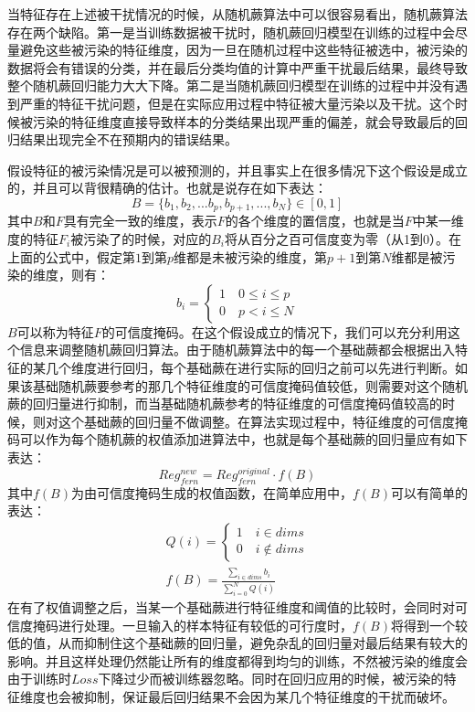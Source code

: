 当特征存在上述被干扰情况的时候，从随机蕨算法中可以很容易看出，随机蕨算法存在两个缺陷。第一是当训练数据被干扰时，随机蕨回归模型在训练的过程中会尽量避免这些被污染的特征维度，因为一旦在随机过程中这些特征被选中，被污染的数据将会有错误的分类，并在最后分类均值的计算中严重干扰最后结果，最终导致整个随机蕨回归能力大大下降。第二是当随机蕨回归模型在训练的过程中并没有遇到严重的特征干扰问题，但是在实际应用过程中特征被大量污染以及干扰。这个时候被污染的特征维度直接导致样本的分类结果出现严重的偏差，就会导致最后的回归结果出现完全不在预期内的错误结果。

假设特征的被污染情况是可以被预测的，并且事实上在很多情况下这个假设是成立的，并且可以背很精确的估计。也就是说存在如下表达：
\begin{equation}
	B=\{b_1,b_2,...b_p,b_{p+1},...,b_N\}\in[0,1]
\end{equation}
其中$B$和$F$具有完全一致的维度，表示$F$的各个维度的置信度，也就是当$F$中某一维度的特征$F_i$被污染了的时候，对应的$B_i$将从百分之百可信度变为零（从1到0）。在上面的公式中，假定第$1$到第$p$维都是未被污染的维度，第$p+1$到第$N$维都是被污染的维度，则有：
\begin{equation}
b_i=
\begin{cases}
1\quad {0\leq i\leq p} \\
0\quad {p<i\leq N}
\end{cases}
\end{equation}
$B$可以称为特征$F$的可信度掩码。在这个假设成立的情况下，我们可以充分利用这个信息来调整随机蕨回归算法。由于随机蕨算法中的每一个基础蕨都会根据出入特征的某几个维度进行回归，每个基础蕨在进行实际的回归之前可以先进行判断。如果该基础随机蕨要参考的那几个特征维度的可信度掩码值较低，则需要对这个随机蕨的回归量进行抑制，而当基础随机蕨参考的特征维度的可信度掩码值较高的时候，则对这个基础蕨的回归量不做调整。在算法实现过程中，特征维度的可信度掩码可以作为每个随机蕨的权值添加进算法中，也就是每个基础蕨的回归量应有如下表达：
\begin{equation}
	Reg_{fern}^{new} = Reg_{fern}^{original}\cdot f(B)
\end{equation}
其中$f(B)$为由可信度掩码生成的权值函数，在简单应用中，$f(B)$可以有简单的表达：
\begin{equation}
\begin{aligned}
	Q(i)=
	\begin{cases}
		1\quad i\in dims \\
		0\quad i\not\in dims
	\end{cases} \\
	f(B)=\frac{\sum_{i\in dims} b_i}{\sum_{i=0}^{N} Q(i)}
\end{aligned}
\end{equation}
在有了权值调整之后，当某一个基础蕨进行特征维度和阈值的比较时，会同时对可信度掩码进行处理。一旦输入的样本特征有较低的可行度时，$f(B)$将得到一个较低的值，从而抑制住这个基础蕨的回归量，避免杂乱的回归量对最后结果有较大的影响。并且这样处理仍然能让所有的维度都得到均匀的训练，不然被污染的维度会由于训练时$Loss$下降过少而被训练器忽略。同时在回归应用的时候，被污染的特征维度也会被抑制，保证最后回归结果不会因为某几个特征维度的干扰而破坏。

